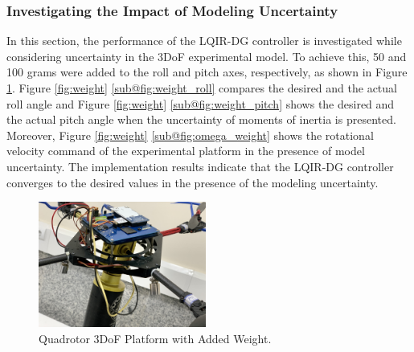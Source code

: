 \documentclass[preprint,12pt,authoryear]{elsarticle}
\begin{document}
\subsubsection{Investigating the Impact of Modeling Uncertainty}\label{sec:model-uncertainty}
\noindent In this section, the performance of the LQIR-DG controller is investigated while considering uncertainty in the 3DoF experimental model. 
To achieve this, 50 and 100 grams were added to the roll and pitch axes, respectively, as shown in Figure \ref{fig:quadrotor_with_weight}.
Figure \ref{fig:weight} \ref{sub@fig:weight_roll} compares the desired and the actual roll angle and Figure \ref{fig:weight} \ref{sub@fig:weight_pitch} shows the desired and the actual pitch angle when the uncertainty of moments of inertia is presented.
Moreover, Figure \ref{fig:weight} \ref{sub@fig:omega_weight} shows the rotational velocity command of the experimental platform in the presence of model uncertainty.
The implementation results indicate that the LQIR-DG controller converges to the desired values in the presence of the modeling uncertainty.
\begin{figure}[H]
	\centering
	\includegraphics[width=0.49\textwidth]{../Figure/implementation/weight/Quad_with_weight.jpg}
	\caption{Quadrotor 3DoF Platform with Added Weight.} %
	\label{fig:quadrotor_with_weight}
 \end{figure}
\end{document}
